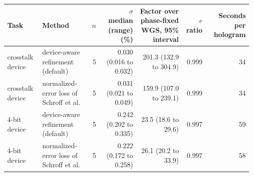 \begin{tabular}{@{}l l r r r r r@{}}
\toprule
Task & Method & $n$ & $\sigma$ median (range) (\%) & Factor over phase-fixed WGS, 95\% interval & $e$ ratio & Seconds per hologram \\
\midrule
crosstalk device & device-aware refinement (default) & 5 & 0.030 (0.016 to 0.032) & 201.3 (132.9 to 304.9) & 0.999 & 34 \\
crosstalk device & normalized-error loss of Schroff et al. & 5 & 0.031 (0.021 to 0.049) & 159.9 (107.0 to 239.1) & 0.999 & 34 \\
4-bit device & device-aware refinement (default) & 5 & 0.242 (0.202 to 0.335) & 23.5 (18.6 to 29.6) & 0.997 & 59 \\
4-bit device & normalized-error loss of Schroff et al. & 5 & 0.222 (0.172 to 0.258) & 26.1 (20.2 to 33.9) & 0.997 & 58 \\
\bottomrule
\end{tabular}
